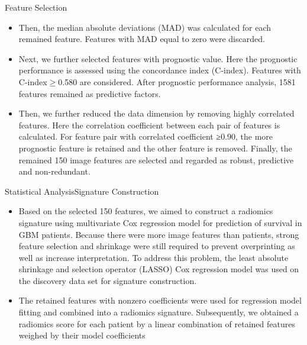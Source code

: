 \documentclass[
]{beamer}
\begin{document}
	\begin{frame}{Feature Selection}
		\begin{itemize}
			\item Then, the median absolute deviations (MAD) was calculated for each remained feature. Features with MAD
			equal to zero were discarded.
			\item Next, we further selected features with prognostic value. Here the prognostic performance is assessed
			using the concordance index (C-index).  Features with C-index$\geq$0.580 are considered.  After prognostic performance analysis, 1581 features remained
			as predictive factors.
			\item Then, we further reduced
			the data dimension by removing highly correlated features. Here the correlation coefficient between each pair of
			features is calculated. For feature pair with correlated coefficient ≥0.90, the more prognostic feature is retained
			and the other feature is removed. Finally, the remained 150 image features are selected and regarded as robust,
			predictive and non-redundant.
		\end{itemize}
	\end{frame}
	
	\begin{frame}{Statistical Analysis}{Signature Construction}
		\begin{itemize}
			\item Based on the selected 150 features, we aimed to construct a radiomics signature using
			multivariate Cox regression model for prediction of survival in GBM patients. Because there were more image
			features than patients, strong feature selection and shrinkage were still required to prevent overprinting as well as
			increase interpretation. To address this problem, the least absolute shrinkage and selection operator (LASSO) Cox
			regression model was used on the discovery data set for signature construction.
			\item  The retained features with nonzero coefficients were
			used for regression model fitting and combined into a radiomics signature. Subsequently, we obtained a radiomics
			score for each patient by a linear combination of retained features weighed by their model coefficients
		\end{itemize}
	\end{frame}
	
\end{document}
